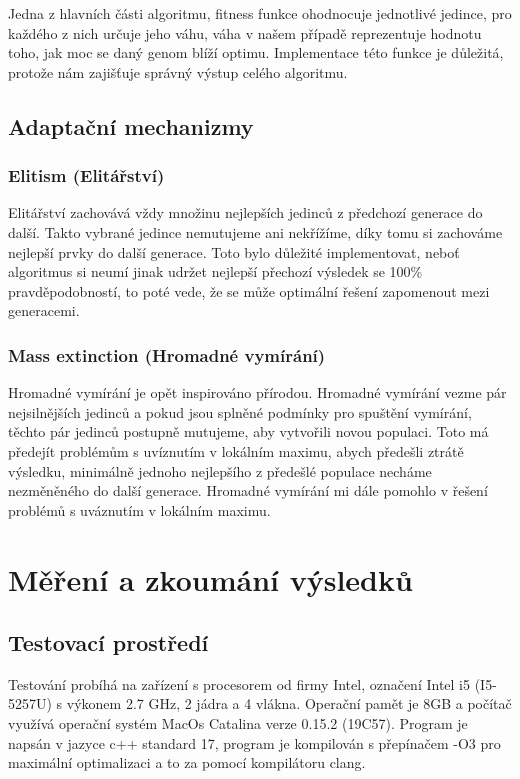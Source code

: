 \documentclass{article}
\begin{document}
    Jedna z hlavních části algoritmu, fitness funkce ohodnocuje jednotlivé jedince, pro každého z nich určuje jeho váhu, váha v našem případě reprezentuje hodnotu toho, jak
    moc se daný genom blíží optimu. Implementace této funkce je důležitá, protože nám zajišťuje správný výstup celého algoritmu.

    \subsection{Adaptační mechanizmy}

    \subsubsection{Elitism (Elitářství)}

    Elitářství zachovává vždy množinu nejlepších jedinců z předchozí generace do další. Takto vybrané jedince nemutujeme ani nekřížíme, díky tomu si zachováme nejlepší prvky do další
    generace. Toto bylo důležité implementovat, neboť algoritmus si neumí jinak udržet nejlepší přechozí výsledek se 100\% pravděpodobností, to poté vede, že se může optimální řešení
    zapomenout mezi generacemi.

    \subsubsection{Mass extinction (Hromadné vymírání)}

    Hromadné vymírání je opět inspirováno přírodou. Hromadné vymírání vezme pár nejsilnějších jedinců a pokud jsou splněné podmínky pro spuštění vymírání, těchto pár jedinců
    postupně mutujeme, aby vytvořili novou populaci. Toto má předejít problémům s uvíznutím v lokálním maximu, abych předešli ztrátě výsledku, minimálně jednoho nejlepšího z předešlé
    populace necháme nezměněného do další generace. Hromadné vymírání mi dále pomohlo v řešení problémů s uváznutím v lokálním maximu.

    \pagebreak

    \section{Měření a zkoumání výsledků}

    \subsection{Testovací prostředí}

    Testování probíhá na zařízení s procesorem od firmy Intel, označení Intel i5 (I5-5257U) s výkonem 2.7 GHz, 2 jádra a 4 vlákna. Operační pamět je 8GB a počítač využívá
    operační systém MacOs Catalina verze 0.15.2 (19C57). Program je napsán v jazyce c++ standard 17, program je kompilován s přepínačem -O3 pro maximální optimalizaci a to za pomocí
    kompilátoru clang.
\end{document}
